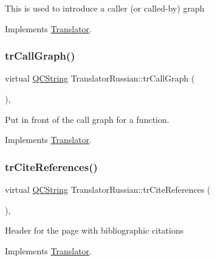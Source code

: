 This is used to introduce a caller (or called-\/by) graph 

Implements \mbox{\hyperlink{class_translator}{Translator}}.

\mbox{\label{class_translator_russian_ae04eda36d556818f082d02d5b527437a}} 
\subsubsection{\texorpdfstring{trCallGraph()}{trCallGraph()}}
{\footnotesize\ttfamily virtual \mbox{\hyperlink{class_q_c_string}{Q\+C\+String}} Translator\+Russian\+::tr\+Call\+Graph (\begin{DoxyParamCaption}{ }\end{DoxyParamCaption})\hspace{0.3cm}{\ttfamily [inline]}, {\ttfamily [virtual]}}

Put in front of the call graph for a function. 

Implements \mbox{\hyperlink{class_translator}{Translator}}.

\mbox{\label{class_translator_russian_a6c2b47d633310bf9a8ca7556fb7c223e}} 
\subsubsection{\texorpdfstring{trCiteReferences()}{trCiteReferences()}}
{\footnotesize\ttfamily virtual \mbox{\hyperlink{class_q_c_string}{Q\+C\+String}} Translator\+Russian\+::tr\+Cite\+References (\begin{DoxyParamCaption}{ }\end{DoxyParamCaption})\hspace{0.3cm}{\ttfamily [inline]}, {\ttfamily [virtual]}}

Header for the page with bibliographic citations 

Implements \mbox{\hyperlink{class_translator}{Translator}}.

\mbox{\label{class_translator_russian_a139bbb6025ed5ad9c7413b46c2250c79}} 
